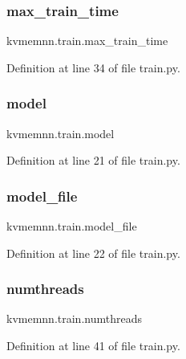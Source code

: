 \subsubsection{\texorpdfstring{max\+\_\+train\+\_\+time}{max\_train\_time}}
{\footnotesize\ttfamily kvmemnn.\+train.\+max\+\_\+train\+\_\+time}



Definition at line 34 of file train.\+py.

\mbox{\label{namespacekvmemnn_1_1train_a8af5e391feea32cee7a2b3d4e0e0d974}} 
\subsubsection{\texorpdfstring{model}{model}}
{\footnotesize\ttfamily kvmemnn.\+train.\+model}



Definition at line 21 of file train.\+py.

\mbox{\label{namespacekvmemnn_1_1train_add5d9815156b41fa669489a582e0324d}} 
\subsubsection{\texorpdfstring{model\+\_\+file}{model\_file}}
{\footnotesize\ttfamily kvmemnn.\+train.\+model\+\_\+file}



Definition at line 22 of file train.\+py.

\mbox{\label{namespacekvmemnn_1_1train_abdc5e71f35132f2f4a0f83704827fa00}} 
\subsubsection{\texorpdfstring{numthreads}{numthreads}}
{\footnotesize\ttfamily kvmemnn.\+train.\+numthreads}



Definition at line 41 of file train.\+py.

